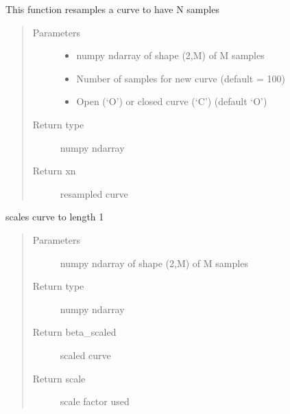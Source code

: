\documentclass[letterpaper,10pt,english]{sphinxmanual}
\begin{document}
\begin{fulllineitems}
\label{\detokenize{curve_functions:curve_functions.resamplecurve}}
This function resamples a curve to have N samples
\begin{quote}\begin{description}
\item[{Parameters}] \leavevmode\begin{itemize}
\item {} 
 \textendash{} numpy ndarray of shape (2,M) of M samples

\item {} 
 \textendash{} Number of samples for new curve (default = 100)

\item {} 
 \textendash{} Open (‘O’) or closed curve (‘C’) (default ‘O’)

\end{itemize}

\item[{Return type}] \leavevmode
numpy ndarray

\item[{Return xn}] \leavevmode
resampled curve

\end{description}\end{quote}

\end{fulllineitems}


\begin{fulllineitems}
\label{\detokenize{curve_functions:curve_functions.scale_curve}}
scales curve to length 1
\begin{quote}\begin{description}
\item[{Parameters}] \leavevmode
{} \textendash{} numpy ndarray of shape (2,M) of M samples

\item[{Return type}] \leavevmode
numpy ndarray

\item[{Return beta\_scaled}] \leavevmode
scaled curve

\item[{Return scale}] \leavevmode
scale factor used

\end{description}\end{quote}

\end{fulllineitems}
\end{document}
